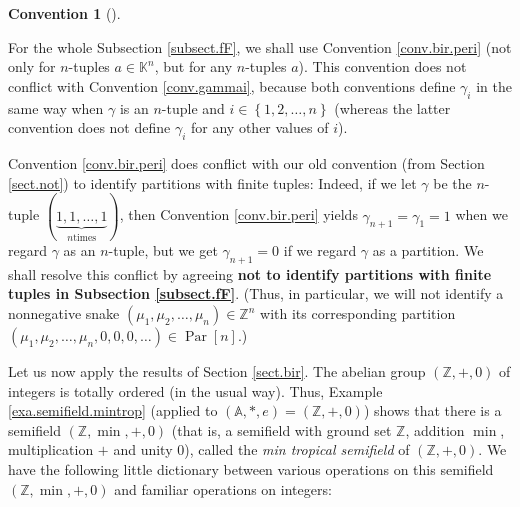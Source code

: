\documentclass[numbers=enddot,12pt,final,onecolumn,notitlepage]{scrartcl}%
\theoremstyle{definition}
\newtheorem{conv}[theo]{Convention}
\newenvironment{convention}[1][]
{\begin{conv}[#1]\begin{leftbar}}
{\end{leftbar}\end{conv}}
\begin{document}
\begin{convention}
For the whole Subsection \ref{subsect.fF}, we shall use Convention
\ref{conv.bir.peri} (not only for $n$-tuples $a\in\mathbb{K}^{n}$, but for any
$n$-tuples $a$). This convention does not conflict with Convention
\ref{conv.gammai}, because both conventions define $\gamma_{i}$ in the same
way when $\gamma$ is an $n$-tuple and $i\in\left\{  1,2,\ldots,n\right\}  $
(whereas the latter convention does not define $\gamma_{i}$ for any other
values of $i$).

Convention \ref{conv.bir.peri} does conflict with our old convention (from
Section \ref{sect.not}) to identify partitions with finite tuples: Indeed, if
we let $\gamma$ be the $n$-tuple $\left(  \underbrace{1,1,\ldots,1}_{n\text{
times}}\right)  $, then Convention \ref{conv.bir.peri} yields $\gamma
_{n+1}=\gamma_{1}=1$ when we regard $\gamma$ as an $n$-tuple, but we get
$\gamma_{n+1}=0$ if we regard $\gamma$ as a partition. We shall resolve this
conflict by agreeing \textbf{not to identify partitions with finite tuples in
Subsection \ref{subsect.fF}}. (Thus, in particular, we will not identify a
nonnegative snake $\left(  \mu_{1},\mu_{2},\ldots,\mu_{n}\right)
\in\mathbb{Z}^{n}$ with its corresponding partition $\left(  \mu_{1},\mu
_{2},\ldots,\mu_{n},0,0,0,\ldots\right)  \in\operatorname*{Par}\left[
n\right]  $.)
\end{convention}

Let us now apply the results of Section \ref{sect.bir}. The abelian group
$\left(  \mathbb{Z},+,0\right)  $ of integers is totally ordered (in the usual
way). Thus, Example \ref{exa.semifield.mintrop} (applied to $\left(
\mathbb{A},\ast,e\right)  =\left(  \mathbb{Z},+,0\right)  $) shows that there
is a semifield $\left(  \mathbb{Z},\min,+,0\right)  $ (that is, a semifield
with ground set $\mathbb{Z}$, addition $\min$, multiplication $+$ and unity
$0$), called the \emph{min tropical semifield} of $\left(  \mathbb{Z}%
,+,0\right)  $. We have the following little dictionary between various
operations on this semifield $\left(  \mathbb{Z},\min,+,0\right)  $ and
familiar operations on integers:
\end{document}
